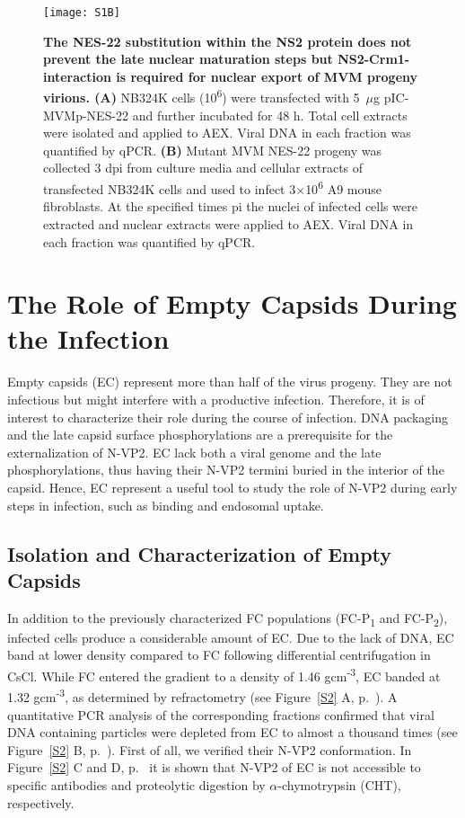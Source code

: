 \begin{figure}[b!]
\centering
  \texttt{[image: S1B]} \\[0.3cm]
  \caption[NS2-Crm1 Interaction is Required for Nuclear Export but Does Not Influence the Late Nuclear Maturation of MVM]
   {\textbf{The NES-22 substitution within the NS2 protein does not prevent the late nuclear maturation steps but NS2-Crm1-interaction is required for nuclear export of MVM progeny virions. (A)} NB324K cells (10\textsuperscript{6}) were transfected with 5~$\mu$g pIC-MVMp-NES-22 and further incubated for 48 h. Total cell extracts were isolated and applied to AEX. Viral DNA in each fraction was quantified by qPCR. \textbf{(B)} Mutant MVM NES-22 progeny was collected 3 dpi from culture media and cellular extracts of transfected NB324K cells and used to infect 3$\times$10\textsuperscript{6} A9 mouse fibroblasts. At the specified times pi the nuclei of infected cells were extracted and nuclear extracts were applied to AEX. Viral DNA in each fraction was quantified by qPCR.} 
\label{S1B}
\end{figure}
\clearpage

\section{The Role of Empty Capsids During the Infection}

Empty capsids (EC) represent more than half of the virus progeny. They are not infectious but might interfere with a productive infection. Therefore, it is of interest to characterize their role during the course of infection. DNA packaging and the late capsid surface phosphorylations are a prerequisite for the externalization of N-VP2. EC lack both a viral genome and the late phosphorylations, thus having their N-VP2 termini buried in the interior of the capsid. Hence, EC represent a useful tool to study the role of N-VP2 during early steps in infection, such as binding and endosomal uptake.   

\subsection{Isolation and Characterization of Empty Capsids}

In addition to the previously characterized FC populations (FC-P\textsubscript{1} and FC-P\textsubscript{2}), infected cells produce a considerable amount of EC. Due to the lack of DNA, EC band at lower density compared to FC following differential centrifugation in CsCl. While FC entered the gradient to a density of 1.46 gcm\textsuperscript{-3}, EC banded at 1.32 gcm\textsuperscript{-3}, as determined by refractometry (see Figure~\ref{S2} A, p.~\pageref{S2}). A quantitative PCR analysis of the corresponding fractions confirmed that viral DNA containing particles were depleted from EC to almost a thousand times (see Figure~\ref{S2} B, p.~\pageref{S2}). First of all, we verified their N-VP2 conformation. In Figure~\ref{S2} C and D, p.~\pageref{S2} it is shown that N-VP2 of EC is not accessible to specific antibodies and proteolytic digestion by $\alpha$-chymotrypsin (CHT), respectively. 

